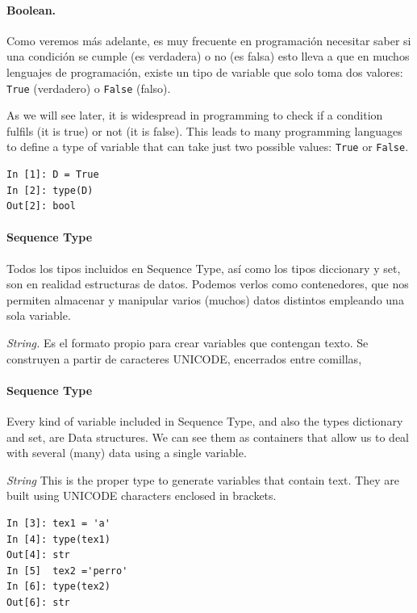 \begin{paracol}{2}
\paragraph{Boolean.} Como veremos más adelante, es muy frecuente en programación necesitar saber si una condición se cumple (es verdadera) o no (es falsa) esto lleva a que en muchos lenguajes de programación, existe un tipo de variable que solo toma dos valores: \texttt{True} (verdadero)  o \texttt{False} (falso).

\switchcolumn
As we will see later, it is widespread in programming to check if a condition fulfils (it is true) or not (it is false). This leads to many programming languages to define a type of variable that can take just two possible values:  \texttt{True} or \texttt{False}. 
\end{paracol}
\begin{center}
    \begin{minipage}{0.2\textwidth}
\begin{verbatim}
In [1]: D = True
In [2]: type(D)
Out[2]: bool
\end{verbatim}
\end{minipage}\end{center}

\begin{paracol}{2}
\paragraph{Sequence Type}
    Todos los tipos incluidos en Sequence Type, así como los tipos diccionary y set, son en realidad estructuras de datos. Podemos verlos como contenedores, que nos permiten almacenar y manipular varios (muchos) datos distintos empleando una sola variable.
         
         \emph{String.} Es el formato propio para crear variables que contengan texto. Se construyen a partir de caracteres UNICODE, encerrados entre comillas,

\switchcolumn
\paragraph{Sequence Type} Every kind of variable included in Sequence Type, and also the types dictionary and set, are Data structures. We can see them as containers that allow us to deal with several (many) data using a single variable.

\emph{String} This is the proper type to generate variables that contain text. They are built using UNICODE characters enclosed in brackets.

\end{paracol}
\begin{center}
\begin{minipage}{0.2\textwidth}
\begin{verbatim}
In [3]: tex1 = 'a'
In [4]: type(tex1)
Out[4]: str
In [5]  tex2 ='perro'
In [6]: type(tex2)
Out[6]: str
\end{verbatim}
\end{minipage}
\end{center}

